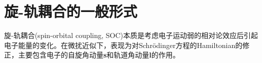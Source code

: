 \documentclass[10pt, oneside, a4paper]{article}      %
\begin{document}

\section{旋-轨耦合的一般形式}
旋-轨耦合(\textrm{spin-orbital coupling, SOC})本质是考虑电子运动弱的相对论效应后引起电子能量的变化。在微扰近似下，表现为对\textrm{Schr\"odinger}方程的\textrm{Hamiltonian}的修正，主要包含电子的自旋角动量\textbf{s}和轨道角动量\textbf{l}的作用。
\end{document}
